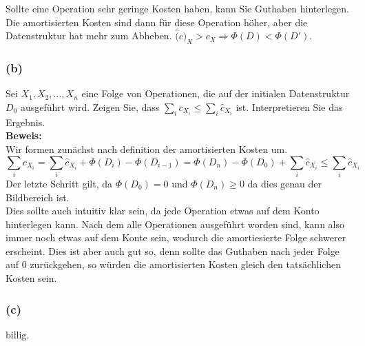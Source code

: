 \documentclass[11pt,a4paper,ngerman]{article}
\begin{document}
Sollte eine Operation sehr geringe Kosten haben, kann Sie Guthaben hinterlegen. Die amortisierten Kosten sind dann für diese Operation höher,
aber die Datenstruktur hat mehr zum Abheben. $\hat(c)_X > c_X \Rightarrow \Phi(D) < \Phi(D')$.

\subsubsection*{(b)}

Sei $X_1, X_2, \dots, X_n$ eine Folge von Operationen, die auf der initialen Datenstruktur $D_0$ ausgeführt wird. Zeigen Sie, dass 
$\sum_i c_{X_i} \leq \sum_i \hat{c}_{X_i}$ ist. Interpretieren Sie das Ergebnis.\\

\noindent\textbf{Beweis:}\\
Wir formen zunächst nach definition der amortisierten Kosten um.
$$
	\sum_i c_{X_i} = \sum_i \hat{c}_{X_i} + \Phi(D_i) - \Phi(D_{i-1}) = \Phi(D_n) - \Phi(D_0) + \sum_i \hat{c}_{X_i} \leq \sum_i \hat{c}_{X_i}
$$
Der letzte Schritt gilt, da $\Phi(D_0) = 0$ und $\Phi(D_n) \geq 0$ da dies genau der Bildbereich ist.\\

Dies sollte auch intuitiv klar sein, da jede Operation etwas auf dem Konto hinterlegen kann. Nach dem alle Operationen ausgeführt worden sind, kann also immer noch etwas auf dem Konte sein, wodurch die amortiesierte Folge schwerer erscheint. Dies ist aber auch gut so, denn sollte das Guthaben nach jeder Folge auf $0$ zurückgehen, so würden die amortisierten Kosten gleich den tatsächlichen Kosten sein.

\subsubsection*{(c)}

billig.

\label{LastPage}
\end{document}
